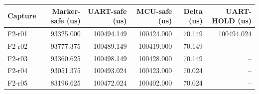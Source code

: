 \begin{tabular}{lrrrrr}
Capture & Marker-safe (us) & UART-safe (us) & MCU-safe (us) & Delta (us) & UART-HOLD (us) \\
\hline
F2-r01 & 93325.000 & 100494.149 & 100424.000 & 70.149 & 100494.024 \\
F2-r02 & 93777.375 & 100489.149 & 100419.000 & 70.149 & -- \\
F2-r03 & 93360.625 & 100498.149 & 100428.000 & 70.149 & -- \\
F2-r04 & 93051.375 & 100493.024 & 100423.000 & 70.024 & -- \\
F2-r05 & 83196.625 & 100472.024 & 100402.000 & 70.024 & -- \\
\end{tabular}
